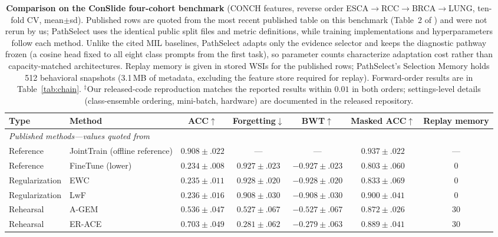 \documentclass{article}
\begin{document}
\begin{table}[!t]
\centering\footnotesize
\caption{\textbf{Comparison on the ConSlide four-cohort benchmark} \cite{huang2023conslide} (CONCH features, reverse order ESCA$\rightarrow$RCC$\rightarrow$BRCA$\rightarrow$LUNG, ten-fold CV, mean$\pm$sd). Published rows are quoted from the most recent published table on this benchmark (Table~2 of \cite{gou2025qpmil}) and were not rerun by us; PathSelect uses the identical public split files and metric definitions, while training implementations and hyperparameters follow each method. Unlike the cited MIL baselines, PathSelect adapts only the evidence selector and keeps the diagnostic pathway frozen (a cosine head fixed to all eight class prompts from the first task), so parameter counts characterize adaptation cost rather than capacity-matched architectures. Replay memory is given in stored WSIs for the published rows; PathSelect's Selection Memory holds 512 behavioral snapshots (3.1\,MB of metadata, excluding the feature store required for replay). Forward-order results are in Table~\ref{tab:chain}. $^\ddagger$Our released-code reproduction matches the reported results within $0.01$ in both orders; settings-level details (class-ensemble ordering, mini-batch, hardware) are documented in the released repository.}
\label{tab:sota}
\begin{tabular}{llccccc}
\toprule
Type & Method & ACC$\uparrow$ & Forgetting$\downarrow$ & BWT$\uparrow$ & Masked ACC$\uparrow$ & Replay memory \\
\midrule
\multicolumn{7}{l}{\emph{Published methods---values quoted from \cite{gou2025qpmil}}} \\
Reference & JointTrain (offline reference) & $0.908{\pm}.022$ & --- & --- & $0.937{\pm}.022$ & --- \\
Reference & FineTune (lower) & $0.234{\pm}.008$ & $0.927{\pm}.023$ & $-0.927{\pm}.023$ & $0.803{\pm}.060$ & 0 \\
Regularization & EWC \cite{kirkpatrick2017ewc} & $0.235{\pm}.011$ & $0.928{\pm}.020$ & $-0.928{\pm}.020$ & $0.833{\pm}.069$ & 0 \\
Regularization & LwF \cite{li2017lwf} & $0.236{\pm}.016$ & $0.908{\pm}.030$ & $-0.908{\pm}.030$ & $0.900{\pm}.041$ & 0 \\
Rehearsal & A-GEM \cite{chaudhry2019agem} & $0.536{\pm}.047$ & $0.527{\pm}.067$ & $-0.527{\pm}.067$ & $0.872{\pm}.026$ & 30 \\
Rehearsal & ER-ACE \cite{caccia2022erace} & $0.703{\pm}.049$ & $0.281{\pm}.062$ & $-0.279{\pm}.063$ & $0.889{\pm}.041$ & 30 \\

\end{tabular}
\end{table}
\end{document}
